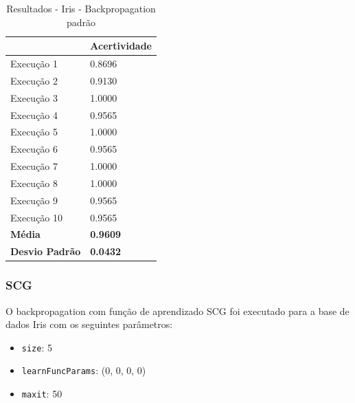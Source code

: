 \begin{table}[h!]
\centering
\caption{Resultados - Iris - Backpropagation padrão}
\label{tabela-resultado-iris-backpropagation-padrao}
\begin{tabular}{ll}
\toprule
                       & \textbf{Acertividade}       \\ \midrule
Execução 1             & 0.8696          \\
Execução 2             & 0.9130          \\
Execução 3             & 1.0000           \\
Execução 4             & 0.9565          \\
Execução 5             & 1.0000           \\
Execução 6             & 0.9565          \\
Execução 7             & 1.0000           \\
Execução 8             & 1.0000           \\
Execução 9             & 0.9565          \\
Execução 10            & 0.9565          \\ \bottomrule
\textbf{Média}         & \textbf{0.9609} \\
\textbf{Desvio Padrão} & \textbf{0.0432}
\end{tabular}
\end{table}



\subsubsection{SCG}

O backpropagation com função de aprendizado SCG foi executado para a base de dados Iris com os seguintes parâmetros:

\begin{itemize}
	\item \texttt{size}: 5
	\item \texttt{learnFuncParams}: (0, 0, 0, 0)
	\item \texttt{maxit}: 50
\end{itemize}

